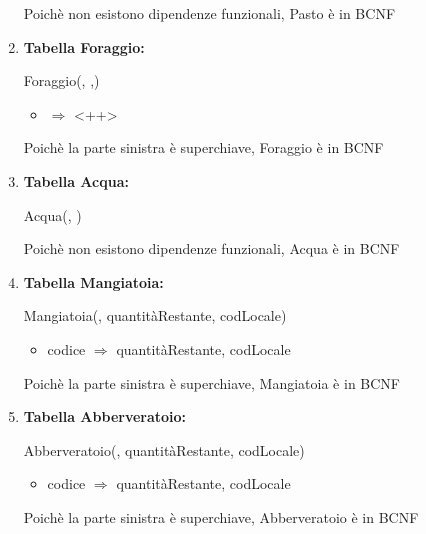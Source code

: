 \documentclass[12pt,a4paper]{article}
\begin{document}
\begin{enumerate}
Poichè non esistono dipendenze funzionali, Pasto è in BCNF
\vspace{10pt}



\item[] \textbf{Tabella Foraggio:}

Foraggio(\underline{}, \underline{},\underline{})
\begin{itemize}
\vspace{-5pt}
\item <++> $\Rightarrow$ <++>
\vspace{-5pt}
\end{itemize}
Poichè la parte sinistra è superchiave, Foraggio è in BCNF
\vspace{10pt}



\item[] \textbf{Tabella Acqua:}

Acqua(\underline{}, \underline{})

Poichè non esistono dipendenze funzionali, Acqua è in BCNF
\vspace{10pt}



\item[] \textbf{Tabella Mangiatoia:}

Mangiatoia(\underline{}, quantitàRestante,  codLocale)
\begin{itemize}
\vspace{-5pt}
\item codice $\Rightarrow$ quantitàRestante, codLocale
\vspace{-5pt}
\end{itemize}
Poichè la parte sinistra è superchiave, Mangiatoia è in BCNF
\vspace{10pt}



\item[] \textbf{Tabella Abberveratoio:}

Abberveratoio(\underline{}, quantitàRestante,  codLocale)
\begin{itemize}
\vspace{-5pt}
\item codice $\Rightarrow$ quantitàRestante, codLocale
\vspace{-5pt}
\end{itemize}
Poichè la parte sinistra è superchiave, Abberveratoio è in BCNF
\vspace{10pt}




\end{enumerate}
\end{document}
